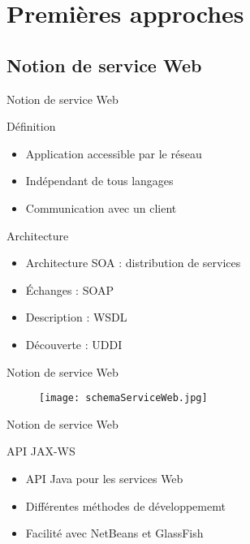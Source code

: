 \section{Premi\`eres approches}

\subsection{Notion de service Web}

\begin{frame}{Notion de service Web}
	\begin{block}{D\'efinition}
		\begin{itemize}
			\item Application accessible par le r\'eseau
			\item Ind\'ependant de tous langages
			\item Communication avec un client
			
		\end{itemize}
		
	\end{block}
	
	\begin{block}{Architecture}
		\begin{itemize}
			\item Architecture SOA : distribution de services
			\item \'Echanges : SOAP
			\item Description : WSDL
			\item D\'ecouverte : UDDI

		\end{itemize}
		
	\end{block}
	
\end{frame}


\begin{frame}{Notion de service Web}
	\begin{figure}[h]
		\centering
		\texttt{[image: schemaServiceWeb.jpg]}
		
	\end{figure}
		
\end{frame}


\begin{frame}{Notion de service Web}
	\begin{block}{API JAX-WS}
		\begin{itemize}
			\item API Java pour les services Web
			\item Diff\'erentes m\'ethodes de d\'eveloppememt
			\item Facilit\'e avec NetBeans et GlassFish
		
		\end{itemize}

	\end{block}

\end{frame}

